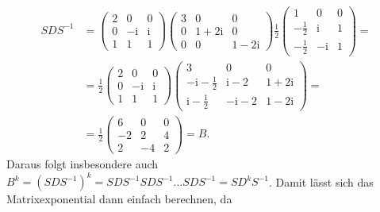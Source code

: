 \documentclass[english, parskip=full]{scrartcl}
\renewcommand{\i}{\text{i}}
\begin{document}
\begin{align}
S DS^{-1} &= \begin{pmatrix}
2 & 0 & 0 \\ 0 & -\i & \i \\ 1 & 1 & 1
\end{pmatrix}\begin{pmatrix}
3 & 0 & 0 \\ 0 & 1+2\i & 0 \\ 0 & 0 & 1-2\i
\end{pmatrix}\frac{1}{2} \begin{pmatrix}
1 & 0 & 0 \\ -\frac{1}{2} & \i & 1 \\ -\frac{1}{2} & -\i & 1
\end{pmatrix} = \\
&= \frac{1}{2} \begin{pmatrix}
2 & 0 & 0 \\ 0 & -\i & \i \\ 1 & 1 & 1
\end{pmatrix}\begin{pmatrix}
3 & 0 & 0 \\ -\i-\frac{1}{2} & \i-2 & 1+2\i \\ \i - \frac{1}{2} & -\i-2 & 1 - 2\i
\end{pmatrix} = \\
&= \frac{1}{2} \begin{pmatrix}
6 & 0 & 0 \\ -2 & 2 & 4 \\ 2 & -4 & 2
\end{pmatrix} = B.
\end{align}
Daraus folgt insbesondere auch $B^k = (SDS^{-1})^k = SDS^{-1}SDS^{-1} \dots SDS^{-1} = SD^kS^{-1}$.
Damit lässt sich das Matrixexponential dann einfach berechnen, da
\end{document}
